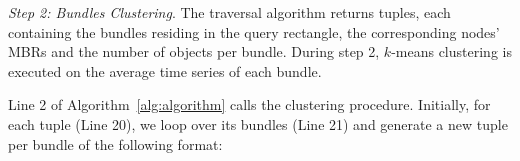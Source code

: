 



\emph{Step 2: Bundles Clustering}.
The traversal algorithm returns tuples, each containing the bundles residing in the query rectangle, the corresponding nodes' MBRs and the number of objects per bundle. During step 2, $k$-means clustering is executed on the average time series of each bundle. 

Line 2 of Algorithm~\ref{alg:algorithm} calls the clustering procedure. Initially, for each tuple (Line 20), we loop over its bundles (Line 21) and generate a new tuple per bundle of the following format: 

